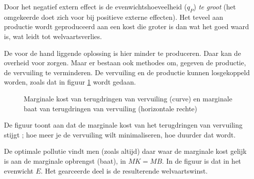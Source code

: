 Door het negatief extern effect is de evenwichtshoeveelheid ($q_P$) \textit{te groot} (het omgekeerde doet zich voor bij positieve externe effecten). Het teveel aan productie wordt geproduceerd aan een kost die groter is dan wat het goed waard is, wat leidt tot welvaartsverlies.
\par De voor de hand liggende oplossing is hier minder te produceren. Daar kan de overheid voor zorgen. Maar er bestaan ook methodes om, gegeven de productie, de vervuiling te verminderen. De vervuiling en de productie kunnen losgekoppeld worden, zoals dat in figuur \ref{fig:h4-polprod} wordt gedaan.

\begin{figure}[H]
\centering
\captionsetup{justification=centering,margin=2cm}
\caption{Marginale kost van terugdringen van vervuiling (curve) en marginale baat van terugdringen van vervuiling (horizontale rechte)}
\label{fig:h4-polprod}
\end{figure}

De figuur toont aan dat de marginale kost van het terugdringen van vervuiling stijgt ; hoe meer je de vervuiling wilt minimaliseren, hoe duurder dat wordt.
\par De optimale pollutie vindt men (zoals altijd) daar waar de marginale kost gelijk is aan de marginale opbrengst (baat), in $MK=MB$. In de figuur is dat in het evenwicht $E$. Het gearceerde deel is de resulterende welvaartswinst.\\

